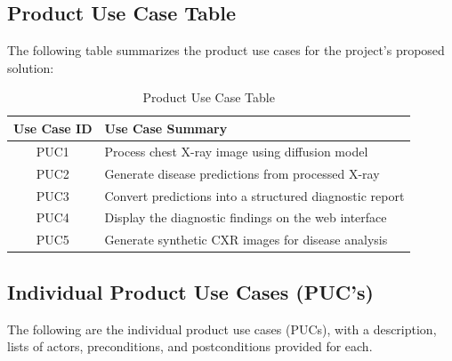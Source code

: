 \documentclass[12pt]{article}
\begin{document}
\subsection{Product Use Case Table}
The following table summarizes the product use cases for the project's proposed solution:

\begin{table}[h!]
    \centering
    \caption{Product Use Case Table}
    \begin{tabular}{|c|p{12cm}|}
        \hline
        \textbf{Use Case ID} & \textbf{Use Case Summary} \\
        \hline
        PUC1 & Process chest X-ray image using diffusion model \\
        \hline
        PUC2 & Generate disease predictions from processed X-ray \\
        \hline
        PUC3 & Convert predictions into a structured diagnostic report \\
        \hline
        PUC4 & Display the diagnostic findings on the web interface \\
        \hline
        PUC5 & Generate synthetic CXR images for disease analysis \\
        \hline
    \end{tabular}
\end{table}
\subsection{Individual Product Use Cases (PUC's)}
The following are the individual product use cases (PUCs), with a description, lists of actors, preconditions, and postconditions provided for each.
\end{document}
